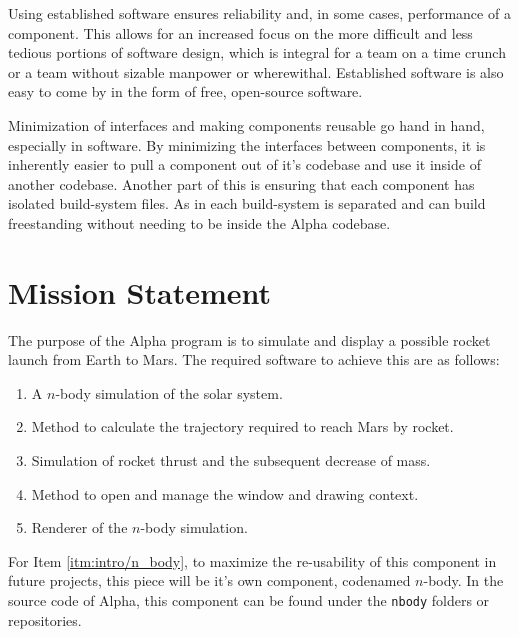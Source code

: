 Using established software ensures reliability and, in some cases, performance
of a component. This allows for an increased focus on the more difficult and
less tedious portions of software design, which is integral for a team on a time
crunch or a team without sizable manpower or wherewithal. Established software
is also easy to come by in the form of free, open-source software.

Minimization of interfaces and making components reusable go hand in hand,
especially in software. By minimizing the interfaces between components, it is
inherently easier to pull a component out of it's codebase and use it inside of
another codebase. Another part of this is ensuring that each component has
isolated build-system files. As in each build-system is separated and can build
freestanding without needing to be inside the Alpha codebase.

\section{Mission Statement}

The purpose of the Alpha program is to simulate and display a possible rocket
launch from Earth to Mars. The required software to achieve this are as follows:

\begin{enumerate} 

    \item \label{itm:intro/n_body} A $n$-body simulation of the solar system.

    \item \label{itm:intro/trajectory} Method to calculate the trajectory
        required to reach Mars by rocket.

    \item \label{itm:intro/rocket} Simulation of rocket thrust and the
        subsequent decrease of mass.

    \item \label{itm:intro/window} Method to open and manage the window and
        drawing context.

    \item \label{itm:intro/renderer} Renderer of the $n$-body simulation.

\end{enumerate}

For Item \ref{itm:intro/n_body}, to maximize the re-usability of this component
in future projects, this piece will be it's own component, codenamed $n$-body.
In the source code of Alpha, this component can be found under the
\texttt{nbody} folders or repositories.

